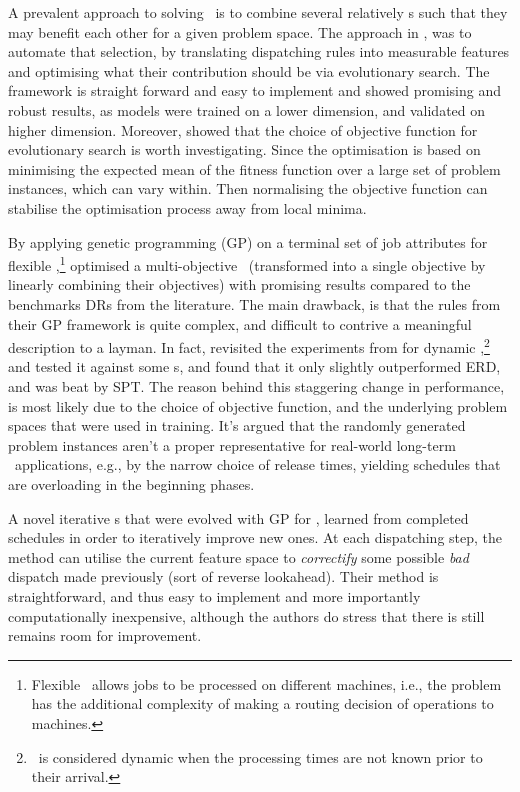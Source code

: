 \documentclass[smallextended]{svjour3}
\begin{document}
A prevalent approach to solving \JSP\ is to combine several relatively \sdr s 
such that they may benefit each other for a given problem space. 
The approach in \cite{InRu14}, was to automate that selection, by 
translating dispatching rules into measurable features and optimising what 
their contribution should be via evolutionary search. The framework is straight 
forward and easy to implement and showed promising and robust results, 
as models were trained on a lower dimension, and validated on higher dimension. 
Moreover, \cite{InRu14} showed that the choice of objective 
function  for evolutionary search is worth investigating. Since the 
optimisation is based on minimising the expected mean of the fitness function 
over a large set of problem instances, which can vary within. Then normalising 
the objective function can stabilise the optimisation process away from local 
minima. 

By applying genetic programming (GP) on a terminal set of job attributes for 
flexible \jsp,\footnote{Flexible \jsp\ allows jobs to be processed on different 
machines, i.e., the problem has the additional complexity of making a routing 
decision of operations to machines.} \cite{Tay08} optimised a multi-objective 
\jsp~(transformed into a single objective by linearly combining their 
objectives) with promising results 
compared to the benchmarks DRs from the literature.
The main drawback, is that the rules from their GP framework is quite complex, 
and difficult to contrive a meaningful description to a layman.
In fact, \cite{Hildebrandt2010} revisited the experiments from \cite{Tay08} for 
dynamic \jsp,\footnote{\Jsp\ is considered dynamic when the processing times 
are not known prior to their arrival.} and tested it against some \sdr s, and 
found that it only slightly outperformed ERD, and was beat by SPT. The reason 
behind this staggering change in performance, is most likely due to the choice 
of objective function, and the underlying problem spaces that were used in 
training. It's argued that the randomly generated problem instances aren't a 
proper representative for real-world long-term \jsp\ applications, e.g., by the 
narrow choice of release times, yielding schedules that are overloading in the 
beginning phases.

A novel iterative \dr s that were evolved with GP for \JSP, \cite{Nguyen13} 
learned from completed schedules in order to iteratively improve new ones. 
At each dispatching step, the method can utilise the current feature space to 
\emph{correctify} some possible \emph{bad} dispatch made previously (sort of 
reverse lookahead). Their method is straightforward, and thus easy to 
implement and more importantly computationally inexpensive, although the 
authors do stress that there is still remains room for improvement.
\end{document}
